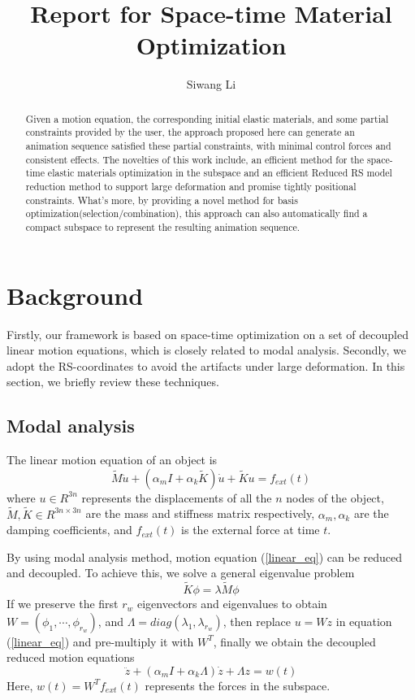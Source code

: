 \documentclass[9pt,twocolumn]{extarticle}
\author{Siwang Li}
\title{Report for Space-time Material Optimization}
\begin{document}
\maketitle

\setlength{\parskip}{0.5ex}
\begin{abstract}
  Given a motion equation, the corresponding initial elastic materials, and some
  partial constraints provided by the user, the approach proposed here can
  generate an animation sequence satisfied these partial constraints, with
  minimal control forces and consistent effects. The novelties of this work
  include, an efficient method for the space-time elastic materials optimization
  in the subspace and an efficient Reduced RS model reduction method to support
  large deformation and promise tightly positional constraints. What's more, by
  providing a novel method for basis optimization(selection/combination), this
  approach can also automatically find a compact subspace to represent the
  resulting animation sequence.
\end{abstract}

\section{Background}\label{sec:background}
Firstly, our framework is based on space-time optimization on a set of decoupled
linear motion equations, which is closely related to modal analysis. Secondly,
we adopt the RS-coordinates to avoid the artifacts under large deformation. In
this section, we briefly review these techniques.

\subsection{Modal analysis}
The linear motion equation of an object is
\begin{equation} \label{linear_eq}
  \tilde{M}\ddot{u} + (\alpha_mI+\alpha_k\tilde{K})\dot{u} + \tilde{K}u = f_{ext}(t)
\end{equation}
where $u\in R^{3n}$ represents the displacements of all the $n$ nodes of the
object, $\tilde{M},\tilde{K} \in R^{3n\times 3n}$ are the mass and stiffness
matrix respectively, $\alpha_m,\alpha_k$ are the damping coefficients, and
$f_{ext}(t)$ is the external force at time $t$.

By using modal analysis method, motion equation (\ref{linear_eq}) can be reduced
and decoupled. To achieve this, we solve a general eigenvalue problem
\begin{equation} \label{general_eig}
  \tilde{K}\phi = \lambda \tilde{M}\phi
\end{equation}
If we preserve the first $r_w$ eigenvectors and eigenvalues to obtain
$W=(\phi_1,\cdots,\phi_{r_w})$, and $\Lambda=diag(\lambda_1,\lambda_{r_w})$,
then replace $u=Wz$ in equation (\ref{linear_eq}) and pre-multiply it with
$W^T$, finally we obtain the decoupled reduced motion equations
\begin{equation} \label{ma_eq}
  \ddot{z} + (\alpha_mI+\alpha_k\Lambda)\dot{z} + \Lambda{z} = w(t)
\end{equation}
Here, $w(t)=W^Tf_{ext}(t)$ represents the forces in the subspace.
\end{document}
